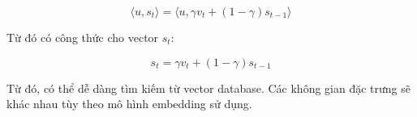 \documentclass{article}
\begin{document}
\[\langle u,s_t \rangle = 
\langle u,\gamma v_t + (1-\gamma)s_{t-1} \rangle\]

Từ đó có công thức cho vector $s_t$:

\[s_t = \gamma v_t + (1-\gamma)s_{t-1}\]

Từ đó, có thể dễ dàng tìm kiếm từ vector database. Các không gian đặc trưng sẽ khác nhau tùy theo mô hình embedding sử dụng.








\end{document}
